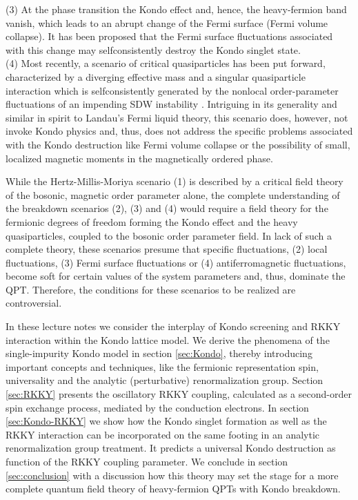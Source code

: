 \documentclass[12pt,twoside]{article}
\begin{document}
(3) At the phase transition the Kondo effect and, hence, the heavy-fermion 
band vanish, which leads to an abrupt change of the Fermi surface 
(Fermi volume collapse). It has been proposed \cite{Senthil04} that the 
Fermi surface fluctuations associated with this change may selfconsistently 
destroy the Kondo singlet state.\\
(4) Most recently, a scenario of critical quasiparticles has been put forward, 
characterized by a diverging effective mass and a singular quasiparticle 
interaction which is selfconsistently generated by the nonlocal 
order-parameter fluctuations of an impending SDW instability 
\cite{Woelfle11,Woelfle14, Woelfle16}. 
Intriguing in its generality and similar in spirit to Landau's Fermi liquid 
theory, this scenario does, however, not invoke Kondo physics and, 
thus, does not address the specific problems associated with the 
Kondo destruction like Fermi volume collapse or the possibility of small, 
localized magnetic moments in the magnetically ordered phase.

While the Hertz-Millis-Moriya scenario (1) is described by a 
critical field theory of the bosonic, magnetic order parameter alone,
the complete understanding of the breakdown scenarios (2), (3) and (4) would 
require a field theory for the fermionic degrees of freedom forming the 
Kondo effect and the heavy quasiparticles, coupled to the bosonic order 
parameter field. In lack of such a complete theory, 
these scenarios presume that specific fluctuations, (2) local 
fluctuations, (3) Fermi surface fluctuations or 
(4) antiferromagnetic fluctuations, become soft for certain values of the
system parameters and, thus, dominate the QPT. Therefore, the 
conditions for these scenarios to be realized are controversial. 

In these lecture notes we consider the interplay of Kondo screening and RKKY 
interaction within the Kondo lattice model. 
We derive the phenomena of the single-impurity Kondo model 
in section \ref{sec:Kondo}, thereby introducing important concepts and 
techniques, like the fermionic representation spin, universality and 
the analytic (perturbative) renormalization group. 
Section \ref{sec:RKKY} presents the oscillatory RKKY coupling, calculated 
as a second-order spin exchange process, mediated by the conduction electrons.  
In section \ref{sec:Kondo-RKKY} we show how the Kondo singlet formation as
well as the RKKY interaction can be incorporated on the same footing in an
analytic renormalization group treatment. It predicts a universal 
Kondo destruction as function of the RKKY coupling parameter. 
We conclude in section \ref{sec:conclusion} with a discussion 
how this theory may set the stage for a more complete quantum field theory 
of heavy-fermion QPTs with Kondo breakdown.
  
\end{document}
